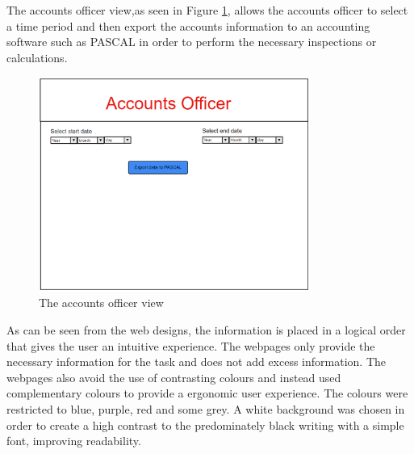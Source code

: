 \documentclass[paper=a4, fontsize=11pt]{scrartcl} %
\numberwithin{equation}{section} %
\numberwithin{figure}{section} %
\numberwithin{table}{section} %
\begin{document}
The accounts officer view,as seen in Figure \ref{Accounts}, allows the accounts officer to select a time period and then export the accounts information to an accounting software such as PASCAL in order to perform the necessary inspections or calculations.
\\

\begin{figure}[hbt!]
\centering
\includegraphics[width=3.5in]{pictures/accounts.png}
\caption{The accounts officer view}
\label{Accounts}
\end{figure}

As can be seen from the web designs, the information is placed in a  logical order that gives the user an intuitive experience. The webpages only provide the necessary information for the task and does not add excess information. The webpages also avoid the use of contrasting colours and instead used complementary colours to provide a ergonomic user experience. The colours were restricted to blue, purple, red and some grey. A white background was chosen in order to create a high contrast to the predominately black writing with a simple font, improving readability.  
\end{document}
